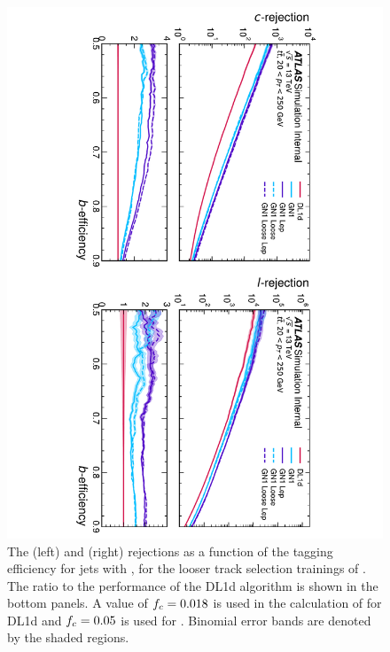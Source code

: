 \begin{figure}[!p]
    \centering
    \includegraphics[width=\textwidth]{chapters/gnn_tagger/figs/gn1_loose_ttbar.pdf}
    \caption{
        The \cjet (left) and \ljet (right) rejections as a function of the \bjet tagging efficiency for \ttbar jets with \ttbarpt, for the looser track selection trainings of \GNN.
        The ratio to the performance of the DL1d algorithm is shown in the bottom panels.
        A value of $f_c = 0.018$ is used in the calculation of \Db for DL1d and $f_c = 0.05$ is used for \GNN.
        Binomial error bands are denoted by the shaded regions.
    }
    \label{fig:ttbar_gn1_loose}
\end{figure}


